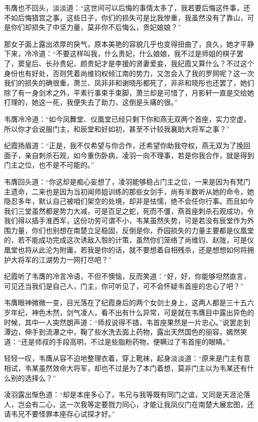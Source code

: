 韦膺也不回头，淡淡道：“这世间可以后悔的事情太多了，我若要后悔这件事，还不如后悔猎宫之事，这些日子，你们的损失可是比我惨重，我虽然没有了靠山，可是你们却损失了中坚力量，莫非你不后悔么，贵妃娘娘？”

那女子面上露出浓厚的戾气，原本美艳的容貌几乎也变得扭曲了，良久，她才平静下来，冷冷道：“不要这样叫我，什么贵妃，什么娘娘，我不过是师姐的棋子罢了，窦皇后、长孙贵妃、颜贵妃才是李援的贤妻爱妾，我纪霞又算什么？不过这个身份也有好处，否则凭着尚维钧权倾江南的势力，又怎会入了我的罗网呢？这一次我们的损失的确很重，萧兰、凤非非和谢晓彤都死了，非非和晓彤也还罢了，她们除了有一身剑术之外，平素行事束手束脚，萧兰却是可惜了，月影轩一直是交给她打理的，她这一死，我便失去了助力，这倒是头痛的很。”

韦膺冷冷道：“如今凤舞堂、仪凰堂已经只剩下你和燕无双两个首座，实力空虚，所以你才会说服门主，和辰堂和好如初，甚至不计较我襄助大将军之事？”

纪霞扬眉道：“正是，我不仅希望与你合作，还希望你助我夺权，燕无双为了挽回面子，亲自刺杀石观，如今重伤卧病，凌羽一向不理事，若是你我合作，就是得到门主之位，也不是不可能的。”

韦膺回头道：“你这却是痴心妄想了，凌羽能够稳占门主之位，一来是因为有梵门主遗命，二来也是因为当初闻师姐训练的那些女剑手，尚有半数听从她的命令，她隐忍多年，默认自己被咱们架空的处境，却非是怯懦，绝不会任你行事。而且如今我们三堂虽然都是势力大减，可是百足之蛇，死而不僵，燕首座刺杀石观成功，令我们得以插手淮西军，这份功劳可谓不小，韦某虽然失势，可是若没有辰堂作为外围力量，你们也别想在南楚立足稳固，反倒是你，乔园损失的力量主要都是仪凰堂的，若不能成功完成这次诱敌入彀的计策，虽然你们笼络了尚维钧、赵陇，可是仪凰堂也将从此沦为附庸，若我是你的话，就不要想着自相残杀，还是想想如何将拥护大将军的江湖势力一网打尽吧？”

纪霞听了韦膺的冷言冷语，不但不懊恼，反而笑道：“好，好，你能够坦然直言，可见还当我们是自己人，门主，你可听见了，可不会怀疑韦首座的忠心了吧？”

韦膺眼神微微一变，目光落在了纪霞身后的两个女剑士身上，这两人都是三十五六岁年纪，神色木然，剑气凌人，看不出有什么异常，可是就在韦膺目中露出异色的时候，其中一人突然朗声道：“师叔说得不错，韦首座果然是一片忠心。”说罢走到潭边，伸手到流瀑之中，鞠了些水洗去面上药物，露出天然国色的丽容，嫣然笑道：“还是师叔的手段高明，不过是些脂粉药物，便瞒过了韦首座的眼睛。”

轻轻一叹，韦膺从容不迫地整理衣着，穿上靴袜，起身淡淡道：“原来是门主有意相试，韦某虽然效命大将军，却也不过是为了本门着想，莫非门主以为韦某还有什么别的选择么？”

凌羽露出惭色道：“却是本座多心了，韦兄与我等既有同门之谊，又同是天涯沦落人，岂会有二心，这一次我等定要戮力同心，才能让我凤仪门在南楚大展宏图，还请韦兄不要怪罪本座存心试探才好。”

